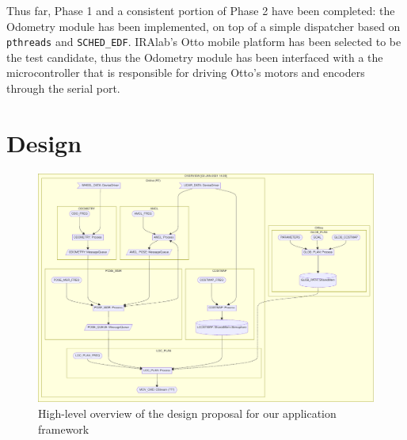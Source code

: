 \documentclass[a4paper,12pt]{report}
\begin{document}
Thus far, Phase 1 and a consistent portion of Phase 2 have been completed: the Odometry module has been implemented, on top of a simple dispatcher based on \texttt{pthreads} and \texttt{SCHED\_EDF}. IRAlab's Otto \cite{fdila-bs-otto} mobile platform has been selected to be the test candidate, thus the Odometry module has been interfaced with a the microcontroller that is responsible for driving Otto's motors and encoders through the serial port.

\section{Design}

\begin{figure}[H]
    \centering
    \includegraphics[width=\textwidth]{img/overview.pdf}
    \caption{High-level overview of the design proposal for our application framework}
\end{figure}
\end{document}
